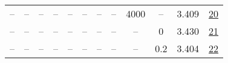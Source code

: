 \begin{table}[H]
\begin{tabular}{cccccccccccc}
-- & -- & -- & -- & -- & -- & -- & -- & 4000 & -- & 3.409 & \href{https://wandb.ai/stanford-mercury/optimizer-scaling/runs/sweep-130m-5B-marspa6f8dflr0.008-wd0.1-minlr0-warmup4000-b10.95--2e019b}{20} \\
-- & -- & -- & -- & -- & -- & -- & -- & -- & 0 & 3.430 & \href{https://wandb.ai/stanford-mercury/optimizer-scaling/runs/sweep-130m-5B-marsp6bc34clr0.008-wd0-minlr0-warmup2000-b10.95-b2-1650e9}{21} \\
-- & -- & -- & -- & -- & -- & -- & -- & -- & 0.2 & 3.404 & \href{https://wandb.ai/stanford-mercury/optimizer-scaling/runs/sweep-130m-5B-mars3cc0bclr0.008-wd0.2-minlr0-warmup2000-b10.95-b-bfae2c}{22} \\
\bottomrule
\end{tabular}
\end{table}

